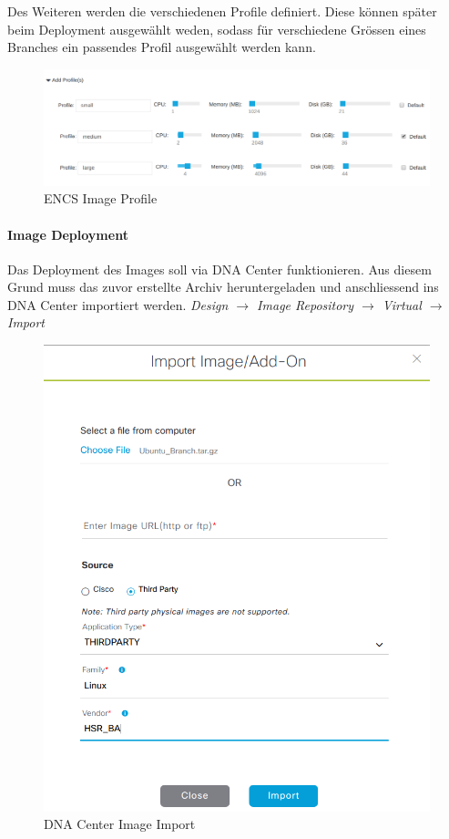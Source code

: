 Des Weiteren werden die verschiedenen Profile definiert. Diese können später beim Deployment ausgewählt weden, sodass für verschiedene Grössen eines Branches ein passendes Profil ausgewählt werden kann.

\begin{figure}[H]
	\centering
	\includegraphics[width=0.8\linewidth]{img/Absicherung/ENCS-Image-Profile.png}
	\caption{ENCS Image Profile}
	\label{fig:ENCS Image Profile}
\end{figure}

\paragraph{Image Deployment}

Das Deployment des Images soll via DNA Center funktionieren. Aus diesem Grund muss das zuvor erstellte Archiv heruntergeladen und anschliessend ins DNA Center importiert werden. \textit{Design $\rightarrow$ Image Repository $\rightarrow$ Virtual $\rightarrow$ Import}

\begin{figure}[H]
	\centering
	\includegraphics[width=0.8\linewidth]{img/Absicherung/DNA-Center-Image-Import.png}
	\caption{DNA Center Image Import}
	\label{fig:DNA Center Image Import}
\end{figure}





